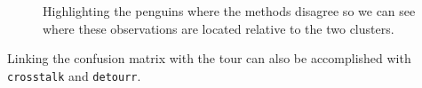 \documentclass[
  letterpaper,
]{krantz}
\begin{document}
\begin{figure}


\caption{\label{fig-compare-clusters2}Highlighting the penguins where
the methods disagree so we can see where these observations are located
relative to the two clusters.}

\end{figure}%

Linking the confusion matrix with the tour can also be accomplished with
\texttt{crosstalk} and \texttt{detourr}.
\end{document}
